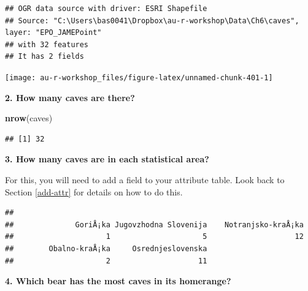 \documentclass[]{book}
\newenvironment{Shaded}{\begin{snugshade}}{\end{snugshade}}
\newcommand{\KeywordTok}[1]{\textcolor[rgb]{0.13,0.29,0.53}{\textbf{#1}}}
\newcommand{\DecValTok}[1]{\textcolor[rgb]{0.00,0.00,0.81}{#1}}
\newcommand{\StringTok}[1]{\textcolor[rgb]{0.31,0.60,0.02}{#1}}
\newcommand{\OperatorTok}[1]{\textcolor[rgb]{0.81,0.36,0.00}{\textbf{#1}}}
\newcommand{\NormalTok}[1]{#1}
\theoremstyle{definition}
\theoremstyle{definition}
\theoremstyle{definition}
\theoremstyle{remark}
\begin{document}
\begin{verbatim}
## OGR data source with driver: ESRI Shapefile 
## Source: "C:\Users\bas0041\Dropbox\au-r-workshop\Data\Ch6\caves", layer: "EPO_JAMEPoint"
## with 32 features
## It has 2 fields
\end{verbatim}

\begin{center}\texttt{[image: au-r-workshop\_files/figure-latex/unnamed-chunk-401-1]} \end{center}

\textbf{2. How many caves are there?}

\begin{Shaded}
\begin{Highlighting}[]
\KeywordTok{nrow}\NormalTok{(caves)}
\end{Highlighting}
\end{Shaded}

\begin{verbatim}
## [1] 32
\end{verbatim}

\textbf{3. How many caves are in each statistical area?}

For this, you will need to add a field to your attribute table. Look
back to Section \ref{add-attr} for details on how to do this.

\begin{Shaded}
\end{Shaded}

\begin{verbatim}
## 
##              GoriÅ¡ka Jugovzhodna Slovenija    Notranjsko-kraÅ¡ka 
##                     1                     5                    12 
##        Obalno-kraÅ¡ka     Osrednjeslovenska 
##                     2                    11
\end{verbatim}

\textbf{4. Which bear has the most caves in its homerange?}
\end{document}
